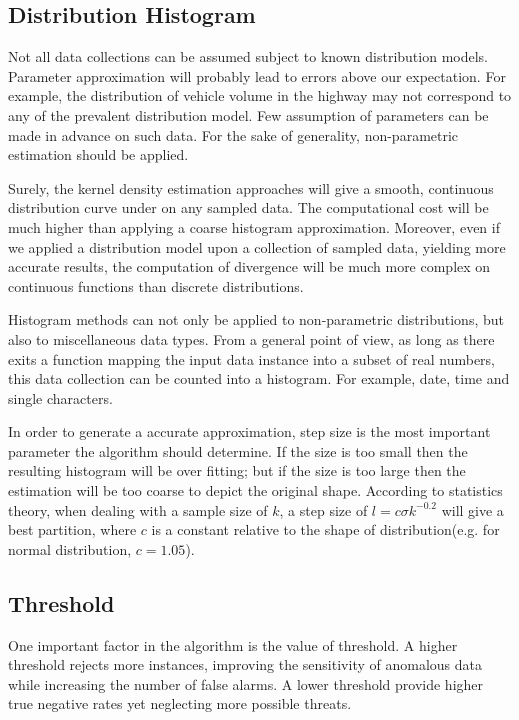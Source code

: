 \documentclass[a4paper]{IEEEtran}
\begin{document}
		\subsection{Distribution Histogram}\label{sec:alg-histogram}
			Not all data collections can be assumed subject to known distribution models. Parameter approximation will probably lead to errors above our expectation. For example, the distribution of vehicle volume in the highway may not correspond to any of the prevalent distribution model. Few assumption of parameters can be made in advance on such data. For the sake of generality, non-parametric estimation should be applied.
			
			Surely, the kernel density estimation approaches will give a smooth, continuous distribution curve under on any sampled data. The computational cost will be much higher than applying a coarse histogram approximation.
			Moreover, even if we applied a distribution model upon a collection of sampled data, yielding more accurate results, the computation of divergence will be much more complex on continuous functions than discrete distributions.
			
			Histogram methods can not only be applied to non-parametric distributions, but also to miscellaneous data types. From a general point of view, as long as there exits a function mapping the input data instance into a subset of real numbers, this data collection can be counted into a histogram. For example, date, time and single characters.
			
			In order to generate a accurate approximation, step size is the most important parameter the algorithm should determine. If the size is too small then the resulting histogram will be over fitting; but if the size is too large then the estimation will be too coarse to depict the original shape. According to statistics theory, when dealing with a sample size of $k$, a step size of $l = c \sigma k^{-0.2}$ will give a best partition, where $c$ is a constant relative to the shape of distribution(e.g. for normal distribution, $c=1.05$).
			
		\subsection{Threshold}\label{sec:alg-threshold}
			One important factor in the algorithm is the value of threshold. A higher threshold rejects more instances, improving the sensitivity of anomalous data while increasing the number of false alarms. A lower threshold provide higher true negative rates yet neglecting more possible threats.
			
\end{document}
